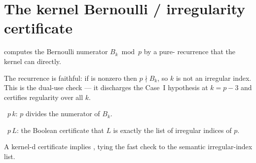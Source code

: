 \section{The kernel Bernoulli / irregularity certificate}\label{sec:bernoulli}

\begin{definition}\label{def:bmodn}
  \leanok
   computes the Bernoulli numerator $B_k \bmod p$ by a pure-
  recurrence that the kernel can  directly.
\end{definition}

\begin{theorem}[Faithfulness]\label{thm:notirr}
  \leanok
  The recurrence is faithful: if  is nonzero then $p \nmid B_k$, so $k$
  is not an irregular index. This is the dual-use check --- it discharges the
  Case~I hypothesis at $k = p-3$ and certifies regularity over all $k$.
\end{theorem}

\begin{definition}\label{def:isirr}
  \leanok
  ~$p\,k$: $p$ divides the numerator of $B_k$.
\end{definition}

\begin{definition}\label{def:irrcert}
  \leanok
  ~$p\,L$: the Boolean certificate that $L$ is exactly the list of
  irregular indices of $p$.
\end{definition}

\begin{theorem}\label{thm:irrcertbridge}
  \leanok
  A kernel-d  certificate implies , tying
  the fast check to the semantic irregular-index list.
\end{theorem}
